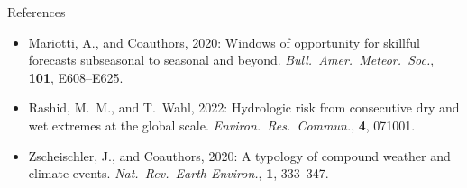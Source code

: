 \documentclass[aspectratio=169]{beamer}
\begin{document}
\begin{frame}{References}
\begin{itemize}
    \item Mariotti, A., and Coauthors, 2020: Windows of opportunity for skillful forecasts subseasonal to seasonal and beyond. \textit{Bull.\ Amer.\ Meteor.\ Soc.}, \textbf{101}, E608--E625.

    \item Rashid, M.~M., and T.~Wahl, 2022: Hydrologic risk from consecutive dry and wet extremes at the global scale. \textit{Environ.\ Res.\ Commun.}, \textbf{4}, 071001.

    \item Zscheischler, J., and Coauthors, 2020: A typology of compound weather and climate events. \textit{Nat.\ Rev.\ Earth Environ.}, \textbf{1}, 333--347.

    \end{itemize}

\end{frame}

\appendix
\end{document}
